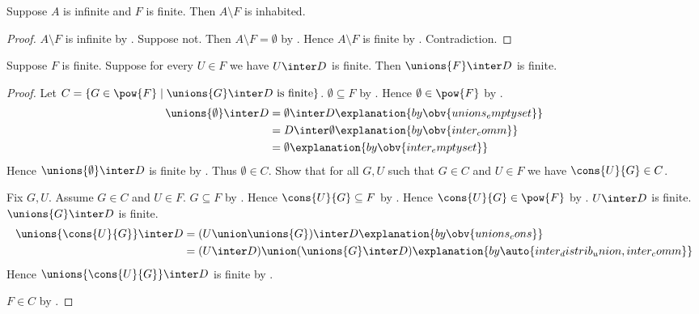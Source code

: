 \begin{corollary}\label{infinite_minus_finite_inhabited}
    Suppose $A$ is infinite and $F$ is finite.
    Then $A\setminus F$ is inhabited.
\end{corollary}
\begin{proof}
    $A\setminus F$ is infinite by .
    Suppose not.
    Then $A\setminus F=\emptyset$ by .
    Hence $A\setminus F$ is finite by .
    Contradiction.
\end{proof}

\begin{theorem}\label{finite_union_has_finite_trace}
    Suppose $F$ is finite.
    Suppose for every $U\in F$ we have $U\inter D$ is finite.
    Then $\unions{F}\inter D$ is finite.
\end{theorem}
\begin{proof}
    Let $C=\{G\in\pow{F}\mid
        \text{$\unions{G}\inter D$ is finite}\}$.
    $\emptyset\subseteq F$ by .
    Hence $\emptyset\in\pow{F}$ by .
    \begin{align*}
        \unions{\emptyset}\inter D
            &= \emptyset\inter D
                \explanation{by \obv{unions_emptyset}}
            \\
            &= D\inter\emptyset
                \explanation{by \obv{inter_comm}}
            \\
            &= \emptyset
                \explanation{by \obv{inter_emptyset}}
    \end{align*}
    Hence $\unions{\emptyset}\inter D$ is finite
        by .
    Thus $\emptyset\in C$.
    Show that for all $G,U$ such that $G\in C$ and $U\in F$ we have
        $\cons{U}{G}\in C$.
    \begin{subproof}
        Fix $G,U$.
        Assume $G\in C$ and $U\in F$.
        $G\subseteq F$ by .
        Hence $\cons{U}{G}\subseteq F$ by .
        Hence $\cons{U}{G}\in\pow{F}$ by .
        $U\inter D$ is finite.
        $\unions{G}\inter D$ is finite.
        \begin{align*}
            \unions{\cons{U}{G}}\inter D
                &= (U\union\unions{G})\inter D
                    \explanation{by \obv{unions_cons}}
                \\
                &= (U\inter D)\union(\unions{G}\inter D)
                    \explanation{by \auto{inter_distrib_union,inter_comm}}
        \end{align*}
        Hence $\unions{\cons{U}{G}}\inter D$ is finite
            by .
    \end{subproof}
    $F\in C$ by .
\end{proof}

